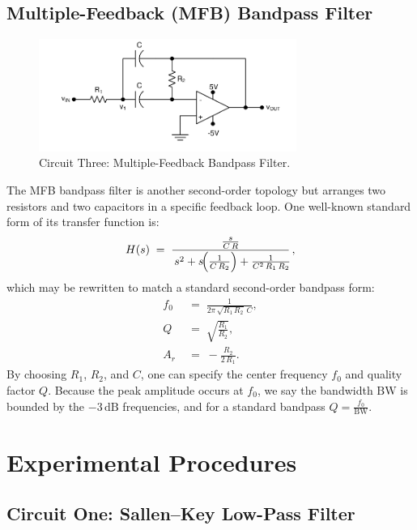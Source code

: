 \documentclass[12pt]{article}
\begin{document}
\subsection{Multiple-Feedback (MFB) Bandpass Filter}

\begin{figure}[H]
	\centering
	\includegraphics[width=0.75\textwidth]{07_multfeed}
	\caption{Circuit Three: Multiple-Feedback Bandpass Filter.}
	\label{fig:multfeed}
\end{figure}

The MFB bandpass filter is another second-order topology but arranges two
resistors and two capacitors in a specific feedback loop. One well-known
standard form of its transfer function is:
\begin{equation*}
H(s) \;=\; 
\frac{\frac{s}{C\,R}}
{\,s^2 + s\!\Bigl(\tfrac{1}{C\,R_2}\Bigr) + \tfrac{1}{C^2\,R_1\,R_2}\!}\,,
\end{equation*}
which may be rewritten to match a standard second-order bandpass form:
\begin{align*}
f_0 &\;=\; \frac{1}{2\pi\,\sqrt{R_1\,R_2}\,C}, \\[6pt]
Q   &\;=\; \sqrt{\frac{R_1}{R_2}}, \\[6pt]
A_r &\;=\; -\frac{R_2}{2\,R_1}.
\end{align*}
By choosing $R_1$, $R_2$, and $C$, one can specify the center frequency $f_0$ and
quality factor $Q$. Because the peak amplitude occurs at $f_0$, we say the
bandwidth $\mathrm{BW}$ is bounded by the $-3\,\mathrm{dB}$ frequencies, and for
a standard bandpass $Q = \tfrac{f_0}{\mathrm{BW}}$.

\section{Experimental Procedures}

\subsection{Circuit One: Sallen--Key Low-Pass Filter}
\end{document}
